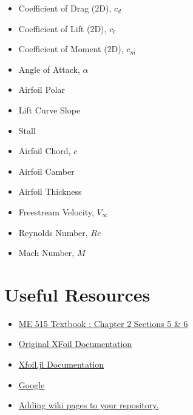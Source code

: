 \documentclass[12pt]{article}
\begin{document}
\begin{multicols}{2}
	\begin{itemize}
		\item Coefficient of Drag (2D), $c_d$
		\item Coefficient of Lift (2D), $c_l$
		\item Coefficient of Moment (2D), $c_m$
		\item Angle of Attack, $\alpha$
		\item Airfoil Polar
		\item Lift Curve Slope
		\item Stall
		\item Airfoil Chord, $c$
		\item Airfoil Camber
		\item Airfoil Thickness
		\item Freestream Velocity, $V_\infty$
		\item Reynolds Number, $Re$
		\item Mach Number, $M$
	\end{itemize}
\end{multicols}


\section{Useful Resources}

\begin{itemize}
 	\item \href{https://byu.box.com/shared/static/ywfayozbj3sr2ot6b32u8nqk5brqvurt.pdf}{ME 515 Textbook : Chapter 2 Sections 5 \& 6}
 	\item \href{http://web.mit.edu/drela/Public/web/xfoil/xfoil_doc.txt}{Original XFoil Documentation}
  	\item \href{https://flow.byu.edu/Xfoil.jl/stable/}{Xfoil.jl Documentation}
 	\item \href{https://www.google.com/}{Google}
	\item \href{https://docs.github.com/en/communities/documenting-your-project-with-wikis/adding-or-editing-wiki-pages}{Adding wiki pages to your repository.}
\end{itemize}
\end{document}

